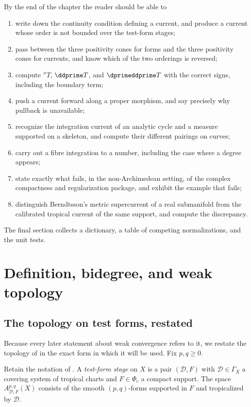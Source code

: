 By the end of the chapter the reader should be able to
\begin{enumerate}
\item write down the continuity condition defining a current, and produce a
  current whose order is not bounded over the test-form stages;
\item pass between the three positivity cones for forms and the three
  positivity cones for currents, and know which of the two orderings is
  reversed;
\item compute $\dprime T$, $\ddprime T$, and $\dprimeddprime T$ with the
  correct signs, including the boundary term;
\item push a current forward along a proper morphism, and say precisely why
  pullback is unavailable;
\item recognize the integration current of an analytic cycle and a measure
  supported on a skeleton, and compute their different pairings on curves;
\item carry out a fibre integration to a number, including the case where a
  degree appears;
\item state exactly what fails, in the non-Archimedean setting, of the
  complex compactness and regularization package, and exhibit the example
  that fails;
\item distinguish Berndtsson's metric supercurrent of a real submanifold from
  the calibrated tropical current of the same support, and compute the
  discrepancy.
\end{enumerate}
The final section collects a dictionary, a table of competing
normalizations, and the unit tests.

\section{Definition, bidegree, and weak topology}
\label{sec:ch14-definition}

\subsection{The topology on test forms, restated}
\label{sec:ch14-test-topology}

Because every later statement about weak convergence refers to it, we restate
the topology of  in the exact form in which it will be
used.  Fix $p,q\ge0$.

\begin{definition}
\label{def:ch14-test-form-stage}
Retain the notation of .  A \emph{test-form stage}
on $X$ is a pair $(\mathscr D,F)$ with $\mathscr D\in\Gamma_X$ a covering
system of tropical charts and $F\in\Phi_c$ a compact support.  The space
$A_{\mathscr D,F}^{p,q}(X)$ consists of the smooth $(p,q)$-forms supported in
$F$ and tropicalized by $\mathscr D$.
\end{definition}

